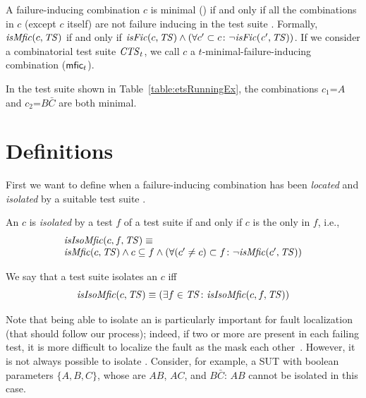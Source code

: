\begin{tikzborder}{\cite{Gargantini16:validation}}
\begin{tikzborder}{\cite{gargantini_combinatorial_2017}}
\begin{tikzborder}{\cite{garn2019}}
\begin{tikzborder}{\cite{arcaini2019achieving}}
\begin{tikzborder}{}
\begin{defn}\label{def:mfic}
	A failure-inducing combination $c$ is minimal (\mfic) if and only if all the combinations in $c$ (except $c$ itself) are not failure inducing in the test suite \ts. Formally, $\mathit{isMfic}(c, \mathit{TS})$ if and only if $\mathit{isFic}(c, \mathit{TS}) \wedge (\forall c^\prime \subset c \colon \neg \mathit{\mathit{isFic}(c^\prime, \mathit{TS})})$. If we consider a combinatorial test suite $\mathit{CTS}_t$, we call $c$ a $t$-minimal-failure-inducing combination ($\textsf{mfic}_t$).
\end{defn}

\begin{example}\label{ex:minFic}
	In the test suite shown in Table~\ref{table:etsRunningEx}, the combinations $c_1$=$A$ and $c_2$=$B\bar{C}$ are both minimal.
\end{example}
\end{tikzborder}

\section{Definitions}\label{sec:definitions}

\begin{tikzborder}{}
First we want to define when a failure-inducing combination has been \emph{located} and \emph{isolated} by a suitable test suite \ts.

\begin{defn}\label{def:isolatedMfic}
	An \mfic $c$ is {\it isolated} by a test $f$ of a test suite \ts if and only if $c$ is the only \fic in $f$, i.e.,
	\[\begin{array}{l}\mathit{isIsoMfic}(c, f, \mathit{TS}) \equiv\\
	\mathit{isMfic}(c, \mathit{TS}) \wedge c \subseteq f \wedge (\forall (c^\prime \neq c) \subset f \colon \neg \mathit{isMfic}(c^\prime, \mathit{TS}))\end{array}\]
	
	We say that a test suite \ts isolates an \mfic $c$ iff
	\[\mathit{isIsoMfic}(c, \mathit{TS}) \equiv (\exists f \in \mathit{TS} \colon \mathit{isIsoMfic}(c, f, \mathit{TS}))\]
\end{defn}

Note that being able to isolate an \mfic is particularly important for fault localization (that should follow our process); indeed, if two or more \mfics are present in each failing test, it is more difficult to localize the fault as the \mfics mask each other~\cite{Niu2018Identifying}. However, it is not always possible to isolate \mfics. Consider, for example, a SUT with boolean parameters $\{A,B,C\}$, whose \truemfics are $AB$, $AC$, and $B\bar{C}$: $AB$ cannot be isolated in this case.


\end{tikzborder}
\end{tikzborder}
\end{tikzborder}
\end{tikzborder}
\end{tikzborder}
